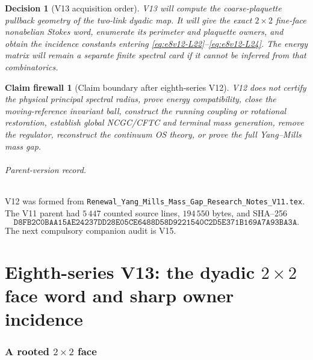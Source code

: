 \documentclass[11pt,oneside]{book}
\newtheorem{firewall}[theorem]{Claim firewall}
\newtheorem{decision}[theorem]{Decision}
\theoremstyle{definition}
\theoremstyle{remark}
\begin{document}
\begin{decision}[V13 acquisition order]
\label{dec:e8v12-V13}
V13 will compute the coarse-plaquette pullback geometry of the
two-link dyadic map.  It will give the exact \(2\times2\) fine-face
nonabelian Stokes word, enumerate its perimeter and plaquette owners,
and obtain the incidence constants entering
\eqref{eq:e8v12-L22}--\eqref{eq:e8v12-L24}.  The energy matrix will
remain a separate finite spectral card if it cannot be inferred from
that combinatorics.
\end{decision}

\begin{firewall}[Claim boundary after eighth-series V12]
\label{fire:e8v12-claim}
V12 does not certify the physical principal spectral radius, prove
energy compatibility, close the moving-reference invariant ball,
construct the running coupling or rotational restoration, establish
global NCGC/CFTC and terminal mass generation, remove the regulator,
reconstruct the continuum OS theory, or prove the full Yang--Mills
mass gap.
\end{firewall}

\paragraph{Parent-version record.}
V12 was formed from
\texttt{Renewal\_Yang\_Mills\_Mass\_Gap\_Research\_Notes\_V11.tex}.
The V11 parent had \(5\,447\) counted source lines,
\(194\,550\) bytes, and SHA--256
\[
\texttt{D8FB2C0BAA15AE24237DD28E05CE6488D58D9221540C2D5E371B169A7A93BA3A}.
\]
The next compulsory companion audit is V15.



\part{Eighth-series V13: the dyadic \(2\times2\) face word and sharp
owner incidence}
\label{part:e8v13}

\section{A rooted \(2\times2\) face}
\label{sec:e8v13-face}
\end{document}

